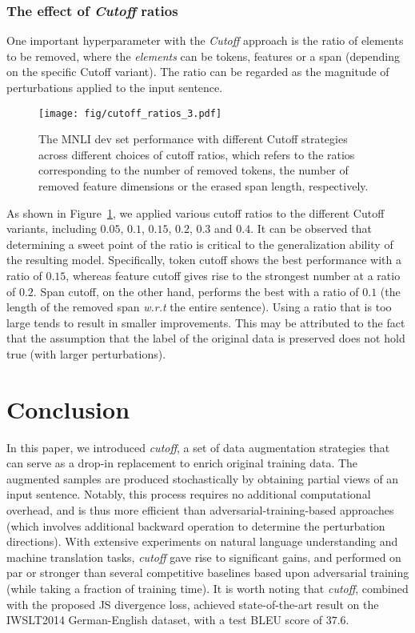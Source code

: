 \documentclass[11pt,a4paper]{article}
\begin{document}
\subsubsection{The effect of \emph{Cutoff} ratios}
\vspace{-1mm}
One important hyperparameter with the \emph{Cutoff} approach is the ratio of elements to be removed, where the \emph{elements} can be tokens, features or a span (depending on the specific Cutoff variant). The ratio can be regarded as the magnitude of perturbations applied to the input sentence.

\begin{figure} [ht!]
	\centering
	\texttt{[image: fig/cutoff\_ratios\_3.pdf]} 
	\vspace{-2mm}
	\caption{The MNLI dev set performance with different Cutoff strategies across different choices of cutoff ratios, which refers to the ratios corresponding to the number of removed tokens, the number of removed feature dimensions or the erased span length, respectively.}
	\label{fig:cutoff_ratios}
	\vspace{-2mm}
\end{figure}

As shown in Figure~\ref{fig:cutoff_ratios}, we applied various cutoff ratios to the different Cutoff variants, including $0.05$, $0.1$, $0.15$, $0.2$, $0.3$ and $0.4$. It can be observed that determining a sweet point of the ratio is critical to the generalization ability of the resulting model. Specifically, token cutoff shows the best performance with a ratio of $0.15$, whereas feature cutoff gives rise to the strongest number at a ratio of $0.2$. Span cutoff, on the other hand, performs the best with a ratio of $0.1$ (the length of the removed span \emph{w.r.t} the entire sentence). Using a ratio that is too large tends to result in smaller improvements. This may be attributed to the fact that the assumption that the label of the original data is preserved does not hold true (with larger perturbations).



\section{Conclusion}
\vspace{-2mm}
In this paper, we introduced \emph{cutoff}, a set of data augmentation strategies that can serve as a drop-in replacement to enrich original training data. The augmented samples are produced stochastically by obtaining partial views of an input sentence. Notably, this process requires no additional computational overhead, and is thus more efficient than adversarial-training-based approaches (which involves additional backward operation to determine the perturbation directions). With extensive experiments on natural language understanding and machine translation tasks, \emph{cutoff} gave rise to significant gains, and performed on par or stronger than several competitive baselines based upon adversarial training (while taking a fraction of training time). It is worth noting that \emph{cutoff}, combined with the proposed JS divergence loss, achieved state-of-the-art result on the IWSLT2014 German-English dataset, with a test BLEU score of $37.6$.
\end{document}
